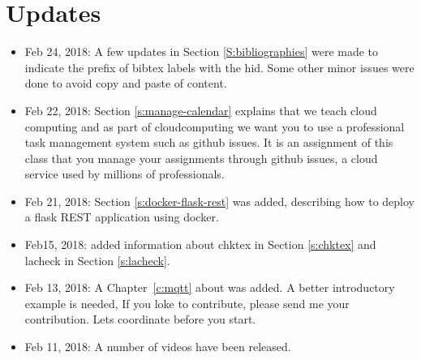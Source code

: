 
\chapter{Updates}


\begin{itemize}

\item Feb 24, 2018: A few updates in Section \ref{S:bibliographies}
  were made to indicate the prefix of bibtex labels with the hid. Some
  other minor issues were done to avoid copy and paste of content.

\item Feb 22, 2018: Section \ref{s:manage-calendar} explains that we
  teach cloud computing and as part of cloudcomputing we want you to
  use a professional task management system such as github issues. It
  is an assignment of this class that you manage your assignments
  through github issues, a cloud service used by millions of
  professionals.

\item Feb 21, 2018: Section \ref{s:docker-flask-rest} was added,
    describing  how to deploy a flask REST
    application using docker. 


\item Feb15, 2018: added information about chktex in
  Section \ref{s:chktex} and lacheck in Section \ref{s:lacheck}.

\item Feb 13, 2018: A Chapter~\ref{c:mqtt} about was added. A better
  introductory example is needed, If you loke to contribute, please
  send me your contribution. Lets coordinate before you start.

\item Feb 11, 2018: A number of videos have been released.



\end{itemize}
